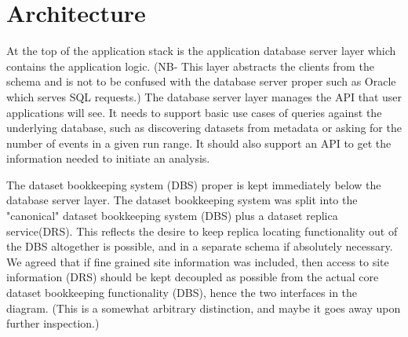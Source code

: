 \documentclass{cmspaper}
\begin{document}
\section{Architecture}


At the top of the application stack is the application database server layer which contains
the application logic.  (NB- This layer abstracts the clients from the schema and is not 
to be confused with the database server proper such as Oracle which serves SQL requests.) 
The database server layer manages the API that user applications will see.  It needs to 
support basic use cases of queries against the underlying database, such as discovering 
datasets from metadata or asking for the number of events in a given run range.  It 
should also support an API to get the information needed to initiate an analysis.  

The dataset bookkeeping system (DBS) proper is kept immediately below the database 
server layer.  The dataset bookkeeping system was split into the "canonical" dataset 
bookkeeping system (DBS) plus a dataset replica service(DRS).  This reflects the 
desire to keep replica locating functionality out of the DBS altogether is possible, 
and in a separate schema if absolutely necessary.    We agreed that if fine grained 
site information was included, then access to site information (DRS) should be kept 
decoupled as possible from the actual core dataset bookkeeping functionality (DBS), 
hence the two interfaces in the diagram.  (This is a somewhat arbitrary distinction, 
and maybe it goes away upon further inspection.)
\end{document}
